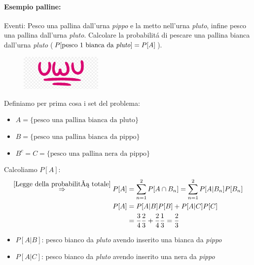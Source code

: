             \paragraph{Esempio palline:}
                Eventi: Pesco una pallina dall'urna \emph{pippo} e la metto nell'urna \emph{pluto}, infine pesco una pallina dall'urna \emph{pluto}.
                Calcolare la probabilitá di pescare una pallina bianca dall'urna \emph{pluto} ($P[\text{pesco 1 bianca da \emph{pluto}}] = P[A]$).  
                \begin{figure}[H]
                    \centering
                    \includegraphics[width = 4cm]{media/uwu.png}
                \end{figure}
                Definiamo per prima cosa i set del problema:
                \begin{itemize}
                    \item {$A = \{ \text{pesco una pallina bianca da pluto}\}$}
                    \item {$B = \{ \text{pesco una pallina bianca da pippo}\}$}
                    \item {$B^c = C = \{ \text{pesco una pallina nera da pippo}\}$}
                \end{itemize}
                Calcoliamo $P[A]$:
                \begin{align}
                    \overset{\ref{Legge della probabilitá totale}}{\Rightarrow} P[A] &= \sum_{n=1}^{2} P[A\cap B_n] = \sum_{n=1}^{2} P[A|B_n] P[B_n] \nonumber \\
                    P[A] &= P[A|B]P[B] + P[A|C]P[C] \nonumber \\
                         &= \frac{3}{4}\frac{2}{3} + \frac{2}{4}\frac{1}{3} = \frac{2}{3}  \nonumber       
                \end{align}
                \begin{itemize}
                    \item {$P[A|B]$: pesco bianco da \emph{pluto} avendo inserito una bianca da \emph{pippo}}
                    \item {$P[A|C]$: pesco bianco da \emph{pluto} avendo inserito una nera da \emph{pippo}}
                \end{itemize}

